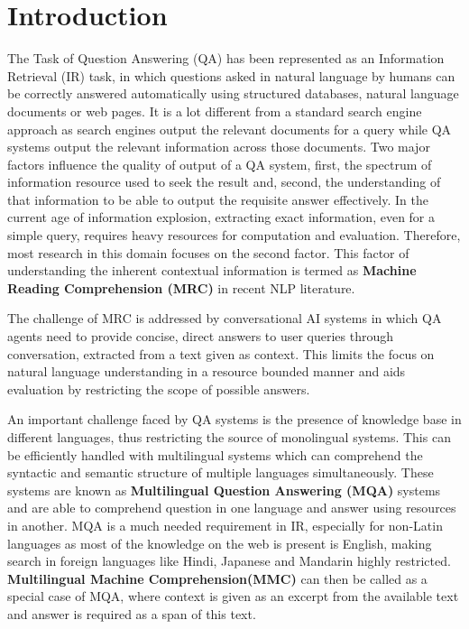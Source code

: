 \documentclass[acmsmall]{acmart}
\begin{document}


\maketitle

\section{Introduction}

\par The Task of Question Answering (QA) has been represented as an Information Retrieval (IR) task, in which questions asked in natural language by humans can be correctly answered automatically using structured databases, natural language documents or web pages. It is a lot different from a standard search engine approach as search engines output the relevant documents for a query while QA systems output the relevant information across those documents. Two major factors influence the quality of output of a QA system, first, the spectrum of information resource used to seek the result and, second, the understanding of that information to be able to output the requisite answer effectively. In the current age of information explosion, extracting exact information, even for a simple query, requires heavy resources for computation and evaluation. Therefore, most research in this domain focuses on the second factor. This factor of understanding the inherent contextual information is termed as \textbf{Machine Reading Comprehension (MRC)} in recent NLP literature. 
\par The challenge of MRC is addressed by conversational AI systems in which QA agents need to provide concise, direct answers to user queries through conversation, extracted from a text given as context. This limits the focus on natural language understanding in a resource bounded manner and aids evaluation by restricting the scope of possible answers.

\par An important challenge faced by QA systems is the presence of knowledge base in different languages, thus restricting the source of monolingual systems. This can be efficiently handled with multilingual systems which can comprehend the syntactic and semantic structure of multiple languages simultaneously. These systems are known as \textbf{Multilingual Question Answering (MQA)} systems and are able to comprehend question in one language and answer using resources in another. MQA is a much needed requirement in IR, especially for non-Latin languages as most of the knowledge on the web is present is English, making search in foreign languages like Hindi, Japanese and Mandarin highly restricted. \textbf{Multilingual Machine Comprehension(MMC)} can then be called as a special case of MQA, where context is given as an excerpt from the available text and answer is required as a span of this text. 
\end{document}
